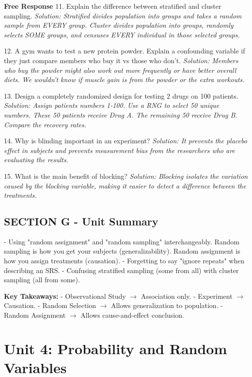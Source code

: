\begin{workbookbox}
\textbf{Free Response}
11. Explain the difference between stratified and cluster sampling.
\textit{Solution: Stratified divides population into groups and takes a random sample from EVERY group. Cluster divides population into groups, randomly selects SOME groups, and censuses EVERY individual in those selected groups.}

12. A gym wants to test a new protein powder. Explain a confounding variable if they just compare members who buy it vs those who don't.
\textit{Solution: Members who buy the powder might also work out more frequently or have better overall diets. We wouldn't know if muscle gain is from the powder or the extra workouts.}

13. Design a completely randomized design for testing 2 drugs on 100 patients.
\textit{Solution: Assign patients numbers 1-100. Use a RNG to select 50 unique numbers. These 50 patients receive Drug A. The remaining 50 receive Drug B. Compare the recovery rates.}

14. Why is blinding important in an experiment?
\textit{Solution: It prevents the placebo effect in subjects and prevents measurement bias from the researchers who are evaluating the results.}

15. What is the main benefit of blocking?
\textit{Solution: Blocking isolates the variation caused by the blocking variable, making it easier to detect a difference between the treatments.}
\end{workbookbox}

\section{SECTION G - Unit Summary}
\begin{trapbox}
- Using "random assignment" and "random sampling" interchangeably. Random sampling is how you get your subjects (generalizability). Random assignment is how you assign treatments (causation).
- Forgetting to say "ignore repeats" when describing an SRS.
- Confusing stratified sampling (some from all) with cluster sampling (all from some).
\end{trapbox}

\textbf{Key Takeaways:}
- Observational Study $\rightarrow$ Association only.
- Experiment $\rightarrow$ Causation.
- Random Selection $\rightarrow$ Allows generalization to population.
- Random Assignment $\rightarrow$ Allows cause-and-effect conclusion.
\chapter{Unit 4: Probability and Random Variables}

